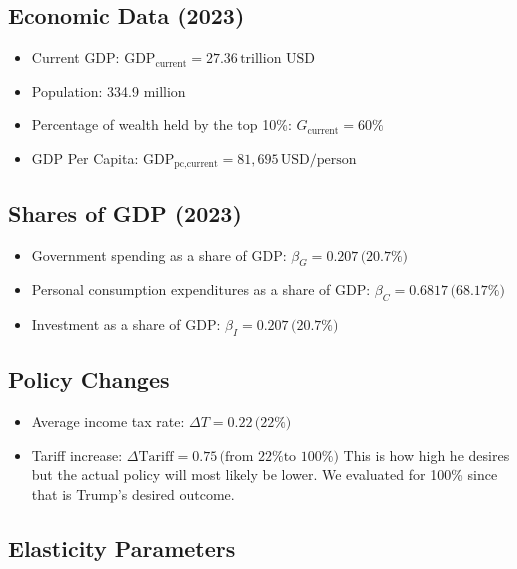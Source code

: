 \documentclass[12pt,letterpaper]{article}
\begin{document}
\subsection*{Economic Data (2023)}

\begin{itemize}
    \item Current GDP: \( \text{GDP}_{\text{current}} = 27.36 \, \text{trillion USD} \) \citep{BEA}
    \item Population: 334.9 million \citep{WorldM}
    \item Percentage of wealth held by the top 10\%: \( G_{\text{current}} = 60\% \) \citep{Fiscal}
    \item GDP Per Capita: \( \text{GDP}_{\text{pc,current}} = 81,695 \, \text{USD/person} \) \citep{Macro}
\end{itemize}

\subsection*{Shares of GDP (2023)}

\begin{itemize}
    \item Government spending as a share of GDP: \( \beta_G =0.207 \, \text{(20.7\%)} \)\citep{Fiscal}
    \item Personal consumption expenditures as a share of GDP: \( \beta_C =0.6817 \, \text{(68.17\%)} \) \citep{BEA}
    \item Investment as a share of GDP: \( \beta_I = 0.207 \, \text{(20.7\%)} \) \citep{CEIC}
\end{itemize}

\subsection*{Policy Changes}

\begin{itemize}
    \item Average income tax rate: \( \Delta T = 0.22 \, \text{(22\%)} \) \citep{IRS}
    \item Tariff increase: \( \Delta \text{Tariff} = 0.75 \, \text{(from 22\% to 100\%)} \) \citep{TaxFound}
    \newline This is how high he desires but the actual policy will most likely 
            be lower. We evaluated for 100\% since that is Trump's desired outcome.
\end{itemize}

\subsection*{Elasticity Parameters}
\end{document}
